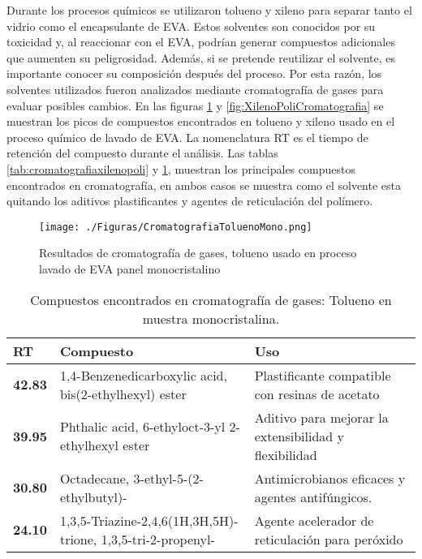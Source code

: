 Durante los procesos químicos se utilizaron tolueno y xileno para separar tanto el vidrio como el encapsulante de EVA. Estos solventes son conocidos por su toxicidad y, al reaccionar con el EVA, podrían generar compuestos adicionales que aumenten su peligrosidad. Además, si se pretende reutilizar el solvente, es importante conocer su composición después del proceso. Por esta razón, los solventes utilizados fueron analizados mediante cromatografía de gases para evaluar posibles cambios. En las figuras \ref{fig:ToluenoMonoCromatografia} y \ref{fig:XilenoPoliCromatografia} se muestran los picos de compuestos encontrados en tolueno y xileno usado en el proceso químico de lavado de EVA. La nomenclatura RT es el tiempo de retención del compuesto durante el análisis. Las tablas \ref{tab:cromatografiaxilenopoli} y \ref{tab:cromatografiatoluenopoli}, muestran los principales compuestos encontrados en cromatografía, en ambos casos se muestra como el solvente esta quitando los aditivos plastificantes y agentes de reticulación del polímero. 


\begin{figure}[htb]
	\begin{center}
		\texttt{[image: ./Figuras/CromatografiaToluenoMono.png]}
	\end{center}
	\vspace{-1em} %
	\caption{Resultados de cromatografía de gases, tolueno usado en proceso lavado de EVA panel monocristalino}
	\label{fig:ToluenoMonoCromatografia}
\end{figure}

\clearpage

\begin{table}[htb]
	\caption{Compuestos encontrados en cromatografía de gases: Tolueno en muestra monocristalina.}
	\vspace{-0.5em} %
	\label{tab:cromatografiatoluenopoli}
	\begin{center}
		\begin{tabular}{|p{3cm}||p{4cm}|p{5cm}|}\hline
			\textbf{RT} & \textbf{Compuesto} & \textbf{Uso}\\ \hline
			\textbf{42.83} & 1,4-Benzenedicarboxylic acid, bis(2-ethylhexyl) ester & Plastificante compatible con resinas de acetato \\ \hline
			\textbf{39.95} & Phthalic acid, 6-ethyloct-3-yl 2-ethylhexyl ester & Aditivo para mejorar la extensibilidad y flexibilidad \\ \hline
			\textbf{30.80} & Octadecane, 3-ethyl-5-(2-ethylbutyl)- & Antimicrobianos eficaces y agentes antifúngicos. \\ \hline
			\textbf{24.10} & 1,3,5-Triazine-2,4,6(1H,3H,5H)-trione, 1,3,5-tri-2-propenyl- & Agente acelerador de reticulación para peróxido\\ \hline	
		\end{tabular}
	\end{center}
\end{table}


